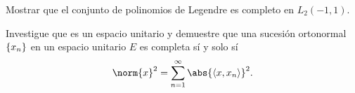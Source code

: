 \begin{ejercicio}
	Mostrar que el conjunto de polinomios de Legendre es completo en $L_2 (-1,1)$.
\end{ejercicio}








\begin{ejercicio}
	Investigue que es un espacio unitario y demuestre que una sucesión ortonormal $\{ x_{n} \}$ en un espacio unitario $E$ es completa sí y solo sí 
		$$ \norm{x}^2 = \sum _{n = 1} ^\infty \abs{\inner{x}{x_n}} ^2. $$
\end{ejercicio}











